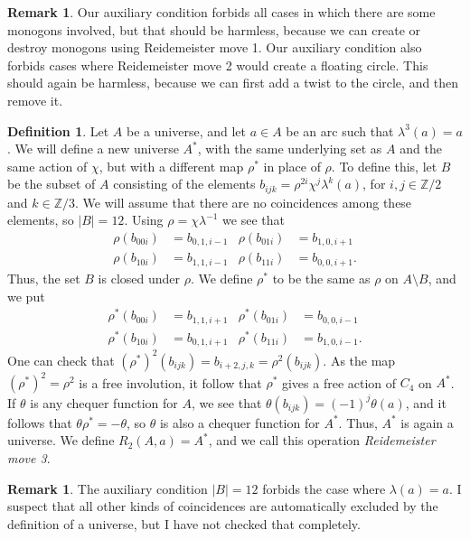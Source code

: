 \documentclass{amsart}
\newcommand{\Z}         {{\mathbb{Z}}}
\newcommand{\sm}        {\setminus}
\newcommand{\tht}       {\theta}
\newcommand{\lm}        {\lambda}
\renewcommand{\:}{\colon}
\theoremstyle{definition}
\newtheorem{remark}[theorem]{Remark}
\newtheorem{definition}[theorem]{Definition}
\begin{document}
\begin{remark}
 Our auxiliary condition forbids all cases in which there are some
 monogons involved, but that should be harmless, because we can create
 or destroy monogons using Reidemeister move 1.  Our auxiliary
 condition also forbids cases where Reidemeister move 2 would create a
 floating circle.  This should again be harmless, because we can first
 add a twist to the circle, and then remove it.
\end{remark}

\begin{definition}
 Let $A$ be a universe, and let $a\in A$ be an arc such that
 $\lm^3(a)=a$.  We will define a new universe $A^*$, with the same
 underlying set as $A$ and the same action of $\chi$, but with a
 different map $\rho^*$ in place of $\rho$.  To define this, let $B$
 be the subset of $A$ consisting of the elements
 $b_{ijk}=\rho^{2i}\chi^j\lm^k(a)$, for $i,j\in\Z/2$ and $k\in\Z/3$.
 We will assume that there are no coincidences among these elements,
 so $|B|=12$.  Using $\rho=\chi\lm^{-1}$ we see that
 \begin{align*}
  \rho(b_{00i}) &= b_{0,1,i-1} & \rho(b_{01i}) &= b_{1,0,i+1} \\
  \rho(b_{10i}) &= b_{1,1,i-1} & \rho(b_{11i}) &= b_{0,0,i+1}.
 \end{align*}
 Thus, the set $B$ is closed under $\rho$.  We define $\rho^*$ to be
 the same as $\rho$ on $A\sm B$, and we put 
 \begin{align*}
  \rho^*(b_{00i}) &= b_{1,1,i+1} & \rho^*(b_{01i}) &= b_{0,0,i-1} \\
  \rho^*(b_{10i}) &= b_{0,1,i+1} & \rho^*(b_{11i}) &= b_{1,0,i-1}.
 \end{align*}
 One can check that $(\rho^*)^2(b_{ijk})=b_{i+2,j,k}=\rho^2(b_{ijk})$.
 As the map $(\rho^*)^2=\rho^2$ is a free involution, it follow that
 $\rho^*$ gives a free action of $C_4$ on $A^*$.  If $\tht$ is any
 chequer function for $A$, we see that $\tht(b_{ijk})=(-1)^j\tht(a)$,
 and it follows that $\tht\rho^*=-\tht$, so $\tht$ is also a chequer
 function for $A^*$.  Thus, $A^*$ is again a universe.  We define
 $R_2(A,a)=A^*$, and we call this operation
 \emph{Reidemeister move 3}.
\end{definition}

\begin{remark}
 The auxiliary condition $|B|=12$ forbids the case where $\lm(a)=a$.
 I suspect that all other kinds of coincidences are automatically
 excluded by the definition of a universe, but I have not checked that
 completely. 
\end{remark}
\end{document}
